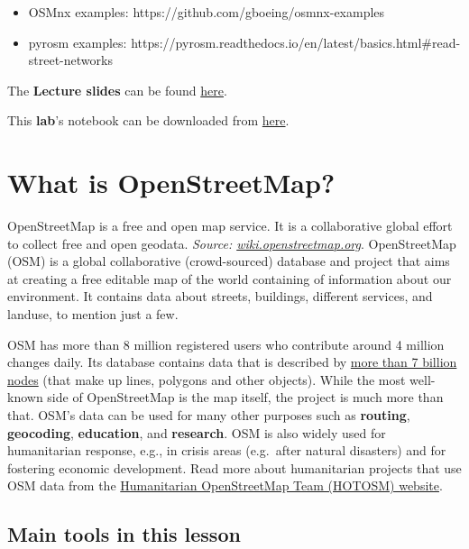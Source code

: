 \documentclass[
  letterpaper,
  DIV=11,
  numbers=noendperiod]{scrreprt}
\providecommand{\tightlist}{%
  \setlength{\itemsep}{0pt}\setlength{\parskip}{0pt}}\usepackage{longtable,booktabs,array}
\begin{document}
\begin{itemize}
\tightlist
\item
  OSMnx examples: https://github.com/gboeing/osmnx-examples
\item
  pyrosm examples:
  https://pyrosm.readthedocs.io/en/latest/basics.html\#read-street-networks
\end{itemize}

The \textbf{Lecture slides} can be found
\href{https://github.com/GDSL-UL/wma/raw/main/lectures/w07.pdf}{here}.

This \textbf{lab}'s notebook can be downloaded from
\href{https://github.com/GDSL-UL/wma/blob/main/labs/w07_osm.ipynb}{here}.

\hypertarget{what-is-openstreetmap}{%
\section{What is OpenStreetMap?}\label{what-is-openstreetmap}}

OpenStreetMap is a free and open map service. It is a collaborative
global effort to collect free and open geodata. \emph{Source:
\href{https://wiki.openstreetmap.org/wiki/Logos}{wiki.openstreetmap.org}}.
OpenStreetMap (OSM) is a global collaborative (crowd-sourced) database
and project that aims at creating a free editable map of the world
containing of information about our environment. It contains data about
streets, buildings, different services, and landuse, to mention just a
few.

OSM has more than 8 million registered users who contribute around 4
million changes daily. Its database contains data that is described by
\href{http://wiki.openstreetmap.org/wiki/Stats}{more than 7 billion
nodes} (that make up lines, polygons and other objects). While the most
well-known side of OpenStreetMap is the map itself, the project is much
more than that. OSM's data can be used for many other purposes such as
\textbf{routing}, \textbf{geocoding}, \textbf{education}, and
\textbf{research}. OSM is also widely used for humanitarian response,
e.g., in crisis areas (e.g.~after natural disasters) and for fostering
economic development. Read more about humanitarian projects that use OSM
data from the \href{https://www.hotosm.org}{Humanitarian OpenStreetMap
Team (HOTOSM) website}.

\hypertarget{main-tools-in-this-lesson}{%
\subsection{Main tools in this lesson}\label{main-tools-in-this-lesson}}
\end{document}
